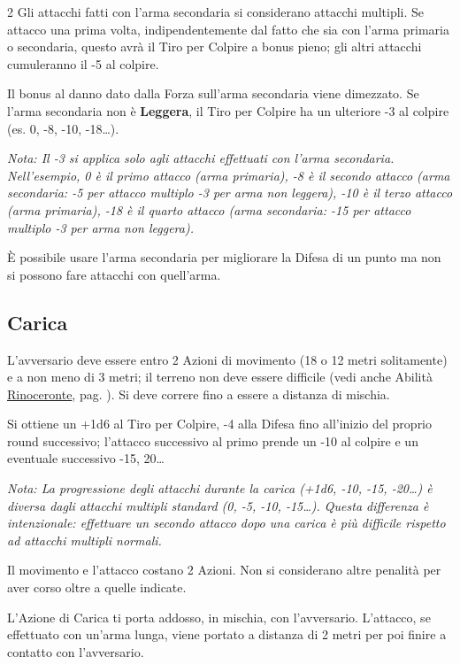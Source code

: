 \begin{multicols}{2}
Gli attacchi fatti con l'arma secondaria si considerano attacchi multipli.
Se attacco una prima volta, indipendentemente dal fatto che sia con l'arma primaria o secondaria, questo avrà il Tiro per Colpire a bonus pieno; gli altri attacchi cumuleranno il -5 al colpire.

Il bonus al danno dato dalla Forza sull'arma secondaria viene dimezzato. Se l'arma secondaria non è \textbf{Leggera}, il Tiro per Colpire ha un ulteriore -3 al colpire (es. 0, -8, -10, -18…).

\textit{Nota: Il -3 si applica solo agli attacchi effettuati con l'arma secondaria. Nell'esempio, 0 è il primo attacco (arma primaria), -8 è il secondo attacco (arma secondaria: -5 per attacco multiplo -3 per arma non leggera), -10 è il terzo attacco (arma primaria), -18 è il quarto attacco (arma secondaria: -15 per attacco multiplo -3 per arma non leggera).}

È possibile usare l'arma secondaria per migliorare la Difesa di un punto ma non si possono fare attacchi con quell'arma.

\subsection{Carica} \label{carica}\hypertarget{carica}{}

L'avversario deve essere entro 2 Azioni di movimento (18 o 12 metri solitamente) e a non meno di 3 metri; il terreno non deve essere difficile (vedi anche Abilità \hyperlink{Rinoceronte}{Rinoceronte}, pag. \pageref{Rinoceronte}). Si deve correre fino a essere a distanza di mischia.

Si ottiene un +1d6 al Tiro per Colpire, -4 alla Difesa fino all'inizio del proprio round successivo; l'attacco successivo al primo prende un -10 al colpire e un eventuale successivo -15, 20…

\textit{Nota: La progressione degli attacchi durante la carica (+1d6, -10, -15, -20…) è diversa dagli attacchi multipli standard (0, -5, -10, -15…). Questa differenza è intenzionale: effettuare un secondo attacco dopo una carica è più difficile rispetto ad attacchi multipli normali.}

Il movimento e l'attacco costano 2 Azioni. Non si considerano altre penalità per aver corso oltre a quelle indicate.

L'Azione di Carica ti porta addosso, in mischia, con l'avversario. L'attacco, se effettuato con un'arma lunga, viene portato a distanza di 2 metri per poi finire a contatto con l'avversario.


\end{multicols}
